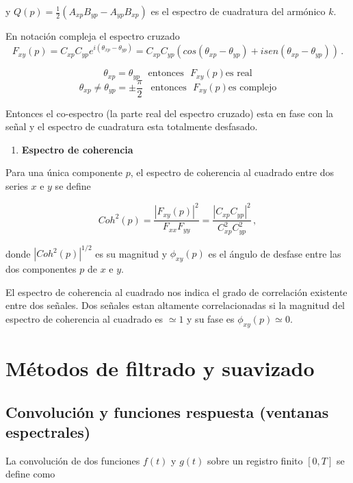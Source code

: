 \documentclass[
]{agujournal2019}
\providecommand{\tightlist}{%
  \setlength{\itemsep}{0pt}\setlength{\parskip}{0pt}}\usepackage{longtable,booktabs,array}
\begin{document}
y \(Q(p)=\frac{1}{2}(A_{xp}B_{yp} - A_{yp}B_{xp})\) es el espectro de
cuadratura del armónico \(k\).

En notación compleja el espectro cruzado
\[F_{xy}(p)=C_{xp}C_{yp}e^{i(\theta_{xp}-\theta_{yp})}=C_{xp}C_{yp}\left(cos(\theta_{xp}-\theta_{yp})+ isen(\theta_{xp}-\theta_{yp}) \right)\,.\]

\[\theta_{xp}=\theta_{yp}\,\,\,\,\,\text{entonces}\,\,\,\,F_{xy}(p) \text{es real}\]
\[\theta_{xp}\ne\theta_{yp}=\pm\frac{\pi}{2}\,\,\,\,\,\text{entonces}\,\,\,\,F_{xy}(p) \text{es complejo}\]

Entonces el co-espectro (la parte real del espectro cruzado) esta en
fase con la señal y el espectro de cuadratura esta totalmente desfasado.

\vspace{0.5cm}

\begin{enumerate}
\def\labelenumi{(\arabic{enumi})}
\setcounter{enumi}{4}
\tightlist
\item
  \textbf{Espectro de coherencia}
\end{enumerate}

Para una única componente \(p\), el espectro de coherencia al cuadrado
entre dos series \(x\) e \(y\) se define

\[Coh^2(p)=\frac{|F_{xy}(p)|^2}{F_{xx}F_{yy}}=\frac{|C_{xp}C_{yp}|^2}{C_{xp}^2C_{yp}^2}\,,\]

donde \(|Coh^2(p)|^{1/2}\) es su magnitud y \(\phi_{xy}(p)\) es el
ángulo de desfase entre las dos componentes \(p\) de \(x\) e \(y\).

El espectro de coherencia al cuadrado nos indica el grado de correlación
existente entre dos señales. Dos señales estan altamente correlacionadas
si la magnitud del espectro de coherencia al cuadrado es \(\simeq 1\) y
su fase es \(\phi_{xy}(p)\simeq 0\).

\section{Métodos de filtrado y
suavizado}\label{muxe9todos-de-filtrado-y-suavizado}

\subsection{Convolución y funciones respuesta (ventanas
espectrales)}\label{convoluciuxf3n-y-funciones-respuesta-ventanas-espectrales}

La convolución de dos funciones \(f(t)\) y \(g(t)\) sobre un registro
finito \([0,T]\) se define como
\end{document}
